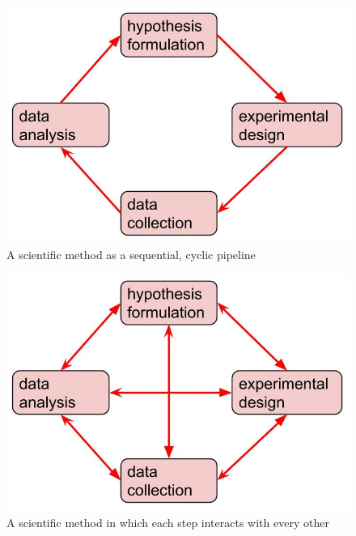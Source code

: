 \begin{figure}
  \includegraphics[scale=0.5]{figures/scientific_method_pipeline}
  \caption{A scientific method as a sequential, cyclic pipeline}
  \label{scientific_method_pipeline}
\end{figure}

\begin{figure}
  \includegraphics[scale=0.5]{figures/scientific_method}
  \caption{A scientific method in which each step interacts with every other}
  \label{scientific_method}
\end{figure}

